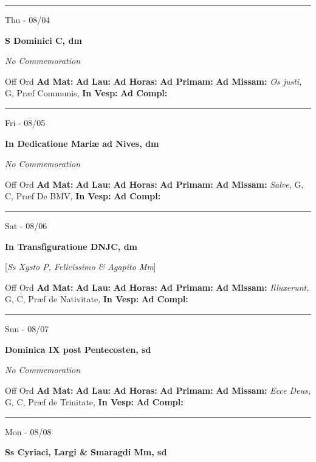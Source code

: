 \documentclass[letterpaper, 10pt]{article}
\begin{document}
\hrule
\begin{center}
Thu - 08/04
\end{center}\textbf{ \large S Dominici C, \textnormal{\normalsize dm}}

\textit{No Commemoration}\begin{justify}
Off Ord
\textbf{Ad Mat: }
\textbf{Ad Lau: }
\textbf{Ad Horas: }
\textbf{Ad Primam: }
\textbf{Ad Missam:} \textit{Os justi, } G, Præf Communis, 
\textbf{In Vesp: }
\textbf{Ad Compl: }\end{justify}



\hrule
\begin{center}
Fri - 08/05
\end{center}\textbf{ \large In Dedicatione Mariæ ad Nives, \textnormal{\normalsize dm}}

\textit{No Commemoration}\begin{justify}
Off Ord
\textbf{Ad Mat: }
\textbf{Ad Lau: }
\textbf{Ad Horas: }
\textbf{Ad Primam: }
\textbf{Ad Missam:} \textit{Salve, } G, C, Præf De BMV, 
\textbf{In Vesp: }
\textbf{Ad Compl: }\end{justify}



\hrule
\begin{center}
Sat - 08/06
\end{center}\textbf{ \large In Transfiguratione DNJC, \textnormal{\normalsize dm}}

[\textit{Ss Xysto P, Felicissimo \& Agapito Mm}]
\begin{justify}
Off Ord
\textbf{Ad Mat: }
\textbf{Ad Lau: }
\textbf{Ad Horas: }
\textbf{Ad Primam: }
\textbf{Ad Missam:} \textit{Illuxerunt, } G, C, Præf de Nativitate, 
\textbf{In Vesp: }
\textbf{Ad Compl: }\end{justify}



\hrule
\begin{center}
Sun - 08/07
\end{center}\textbf{ \large Dominica IX post Pentecosten, \textnormal{\normalsize sd}}

\textit{No Commemoration}\begin{justify}
Off Ord
\textbf{Ad Mat: }
\textbf{Ad Lau: }
\textbf{Ad Horas: }
\textbf{Ad Primam: }
\textbf{Ad Missam:} \textit{Ecce Deus, } G, C, Præf de Trinitate, 
\textbf{In Vesp: }
\textbf{Ad Compl: }\end{justify}



\hrule
\begin{center}
Mon - 08/08
\end{center}\textbf{ \large Ss Cyriaci, Largi \& Smaragdi Mm, \textnormal{\normalsize sd}}
\end{document}
